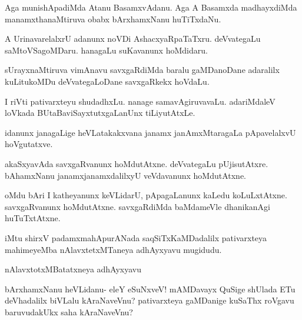 \documentclass{article}
\begin{document}
\begin{mng}%
Aga munishApadiMda Atanu BasamxvAdanu. Aga A Basamxda
madhayxdiMda manamxthanaMtiruva obabx bArxhamxNanu huTiTxdaNu.
\end{mng}

\begin{mng}%
A UrinavarelalxrU adanunx noVDi AshacxyaRpaTaTxru. deVvategaLu
saMtoVSagoMDaru. hanagaLu suKavanunx hoMdidaru.
\end{mng}

\begin{mng}%
sUrayxnaMtiruva vimAnavu savxgaRdiMda baralu gaMDanoDane
adaralilx kuLitukoMDu deVvategaLoDane savxgaRkekx hoVdaLu.
\end{mng}

\begin{mng}%
I riVti pativarxteyu shudadhxLu. nanage samavAgiruvavaLu.
adariMdaleV loVkada BUtaBaviSayxtutxgaLanUnx tiLiyutAtxLe.
\end{mng}

\begin{mng}%
idanunx janagaLige heVLatakakxvana janamx janAmxMtaragaLa pApavelalxvU
hoVgutatxve.
\end{mng}

\begin{mng}%
akaSxyavAda savxgaRvanunx hoMdutAtxne. deVvategaLu pUjisutAtxre.
bAhamxNanu janamxjanamxdalilxyU veVdavanunx hoMdutAtxne.
\end{mng}

\begin{mng}%
oMdu bAri I katheyanunx keVLidarU, pApagaLanunx kaLedu
koLuLxtAtxne. savxgaRvanunx hoMdutAtxne. savxgaRdiMda baMdameVle dhanikanAgi
huTuTxtAtxne.
\end{mng}

\begin{center}
iMtu shirxV padamxmahApurANada saqSiTxKaMDadalilx pativarxteya mahimeyeMba
nAlavxtetxMTaneya adhAyxyavu mugidudu.
\end{center}

\newpage
\begin{center}
{\textbf\large{nAlavxtotxMBatatxneya adhAyxyavu}}
\end{center}

\begin{mng}%
bArxhamxNanu heVLidanu- eleY eSuNxveV! mAMDavayx QuSige
shUlada ETu deVhadalilx biVLalu kAraNaveVnu? pativarxteya gaMDanige kuSaThx
roVgavu baruvudakUkx saha kAraNaveVnu?
\end{mng}
\end{document}
